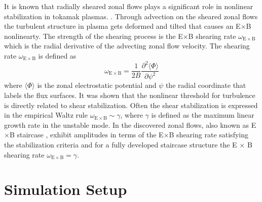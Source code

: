\documentclass[aip, amsmath, amssymb, reprint, twocolumn]{revtex4-1}
\begin{document}


It is known that radially sheared zonal flows plays a significant role in nonlinear stabilization in tokamak plasmas. \cite{WACooper1988,doi:10.1063/1.859529,doi:10.1063/1.873896}. 
Through advection on the sheared zonal flows the turbulent structure in plasma gets deformed and tilted that causes an E$\times$B nonlinearty. \cite{doi:10.1063/1.859529, doi:10.1063/1.871313, doi:10.1063/1.872367}
The strength of the shearing process is the E$\times$B shearing rate $\omega_{\mathrm{E \times B}}$ which is the radial derivative of the advecting zonal flow velocity. \cite{doi:10.1063/1.871313, doi:10.1063/1.872847}
The shearing rate $\omega_{\mathrm{E \times B}}$ is defined as 
\begin{equation}
	\omega_{\mathrm{E \times B}} = \frac{1}{2B} \frac{\partial^2 \langle \Phi \rangle}{\partial \psi^2}
	\label{eq:shearingrate}
\end{equation}
where $\langle \Phi \rangle$ is the zonal electrostatic potential and $\psi$ the radial coordinate that labels the flux surfaces. \cite{doi:10.1063/1.4952621, doi:10.1063/1.3005380}
It was shown that the nonlinear threshold for turbulence is directly related to shear stabilization. \cite{doi:10.1063/1.873896} 
Often the shear stabilization is expressed in the empirical Waltz rule $\omega_{\mathrm{E \times B}} \sim \gamma$, \cite{doi:10.1063/1.870934, doi:10.1063/1.872847} where $\gamma$ is defined as the maximum linear growth rate in the unstable mode. In the discovered zonal flows, also known as E$\times$B staircase \cite{PhysRevE.82.025401}, exhibit amplitudes in terms of the E$\times$B shearing rate satisfying the stabilization criteria and for a fully developed staircase structure the E $\times$ B shearing rate $\omega_{\mathrm{E \times B}} = \gamma$. \cite{doi:10.1063/1.4961231, doi:10.1063/1.4952621}

\section{Simulation Setup}
\label{sec:setup}
\end{document}
